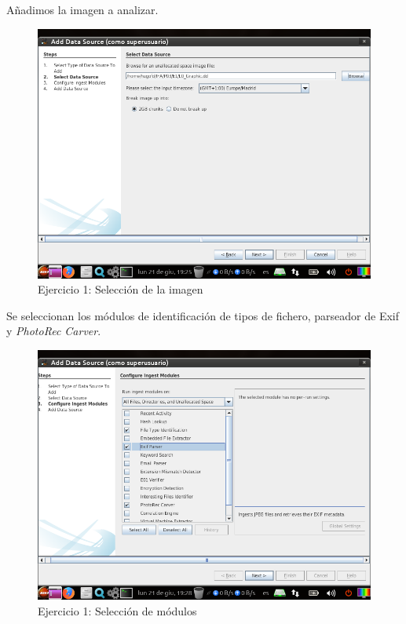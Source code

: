 \documentclass[11pt]{article}
\begin{document}
Añadimos la imagen a analizar.

\begin{figure}[H]
    \caption{Ejercicio 1: Selección de la imagen}
    \centering
    \includegraphics[scale=0.7]{e1-3.png}
\end{figure}

Se seleccionan los módulos de identificación de tipos de fichero, parseador de Exif y \textit{PhotoRec Carver}.

\begin{figure}[H]
    \caption{Ejercicio 1: Selección de módulos}
    \centering
    \includegraphics[scale=0.7]{e1-4.png}
\end{figure}
\end{document}
